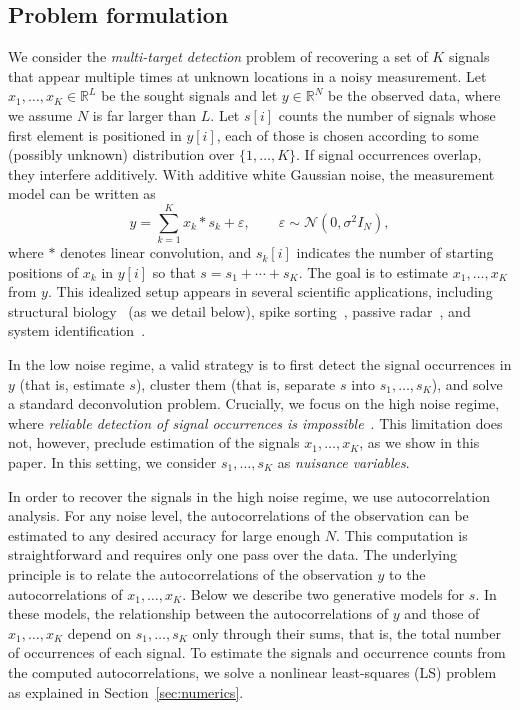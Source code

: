 \documentclass[12pt]{article}
\newcommand{\1}{\mathbf{1}}
\newcommand{\RL}{\mathbb{R}^L}
\newcommand{\RN}{\mathbb{R}^N}
\theoremstyle{plain}
\theoremstyle{definition}
\theoremstyle{remark}
\theoremstyle{plain}
\theoremstyle{remark}
\theoremstyle{plain}
\theoremstyle{plain}
\theoremstyle{plain}
\numberwithin{equation}{section}
\begin{document}
\subsection{Problem formulation} \label{sec:problem_formulation}

We consider the \emph{multi-target detection} problem of recovering a set of $K$ signals that appear 
multiple times at unknown locations in a noisy measurement.
Let $x_1,\ldots,x_K\in\RL$ be the sought signals and let $y\in\RN$ be the observed data, where we assume $N$ is  far larger than $L$. 
Let  $s[i]$ counts the number of signals whose first element is positioned in $y[i]$, each of those  is chosen according to some (possibly unknown) distribution over $\{1,\ldots,K\}$. 
If signal occurrences overlap, they interfere additively. %
With additive white Gaussian noise, the measurement model can be written as 
\begin{equation} 
y  =  \sum_{k=1}^K x_k \ast s_k + \varepsilon, \qquad  \varepsilon   \sim \mathcal{N}(0,\sigma^2 I_N),
\label{eq:model}
\end{equation}
where $\ast$ denotes linear convolution, and $s_k[i]$ indicates the number of starting positions of $x_k$ in $y[i]$ so that $s =  s_1+\cdots+s_K$. 
The goal is  to estimate $x_1,\ldots,x_K$ from $y$. %
This idealized setup appears in several scientific applications, including structural biology~\cite{bendory2018toward} (as we detail below), spike sorting~\cite{lewicki1998review}, passive radar~\cite{gogineni2017passive}, and system identification~\cite{ljung1998system}. 

In the low noise regime, a valid strategy is to first detect the signal occurrences in $y$ (that is, estimate $s$), cluster them (that is, separate $s$ into $s_1,\ldots,s_K$), and solve a standard deconvolution problem. Crucially, we focus on the high noise regime, where \emph{reliable detection of signal occurrences is  impossible}~\cite{bendory2018toward,aguerrebere2016fundamental}.
This limitation does not, however, preclude estimation of the signals $x_1,\ldots,x_K$, as we show in this paper. In this setting, we consider  $s_1,\ldots,s_K$  as \emph{nuisance variables}.

In order to recover the signals in the high noise regime, we use autocorrelation analysis.
For any noise level, the autocorrelations of the observation can be estimated to any desired accuracy for large enough $N$. 
This computation is straightforward and requires only one pass over the data.
The underlying principle is to relate the autocorrelations of the observation $y$ to the autocorrelations of $x_1,\ldots,x_K$.
Below we describe two generative models for $s$.  
In these models, the relationship between the autocorrelations of $y$ and those of $x_1,\ldots,x_K$ depend on $s_1,\ldots,s_K$ only through their sums, that is, the total number of occurrences of each signal.
To estimate the signals and occurrence counts from the computed autocorrelations, we solve a nonlinear least-squares (LS) problem as explained in Section~\ref{sec:numerics}. 
\end{document}
